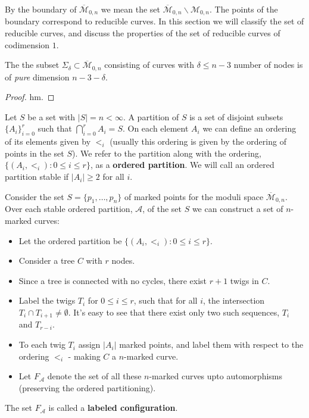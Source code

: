By the boundary of $\overline{\mathcal{M}}_{0,n}$ we mean the set $\overline{\mathcal{M}}_{0,n} \backslash \mathcal{M}_{0,n}$.
The points of the boundary correspond to reducible curves.
In this section we will classify the set of reducible curves, and discuss the properties of the set of reducible curves of codimension $1$.

\begin{proposition}
    The the subset $\Sigma_{\delta} \subset \overline{\mathcal{M}}_{0,n}$ consisting of curves with $\delta \leq n-3$ number of nodes is of \textit{pure} dimension $n-3-\delta$.
\end{proposition}
\begin{proof}
    hm.
\end{proof}

\begin{definition}
    Let $S$ be a set with $|S| = n < \infty$.
    A partition of $S$ is a set of disjoint subsets $\{A_{i}\}_{i=0}^{r}$ such that $\bigcap_{i=0}^{r}A_{i} = S$.
    On each element $A_{i}$ we can define an ordering of its elements given by $<_{i}$ (usually this ordering is given by the ordering of points in the set $S$).
    We refer to the partition along with the ordering, $\{(A_{i},<_{i}): 0 \leq i\leq r\}$, as a \textbf{ordered partition}.
    We will call an ordered partition stable if $|A_{i}|\geq 2$ for all $i$.
\end{definition}

\begin{definition}
    Consider the set $S = \{p_{1}, \dots, p_{n}\}$ of marked points for the moduli space $\overline{\mathcal{M}}_{0,n}$. 
    Over each stable ordered partition, $\mathcal{A}$, of the set $S$ we can construct a set of $n$-marked curves:
    \begin{itemize}
        \item Let the ordered partition be $\{(A_{i},<_{i}): 0 \leq i\leq r\}$.
        \item Consider a tree $C$ with $r$ nodes.
        \item Since a tree is connected with no cycles, there exist $r+1$ twigs in $C$.
        \item Label the twigs $T_{i}$ for $0\leq i \leq r$, such that for all $i$, the intersection $T_{i}\cap T_{i+1} \neq \emptyset$. 
            It's easy to see that there exist only two such sequences, $T_{i}$ and $T_{r-i}$.
        \item To each twig $T_{i}$ assign $|A_{i}|$ marked points, and label them with respect to the ordering $<_{i}$ - making $C$ a $n$-marked curve.
        \item Let $F_{\mathcal{A}}$ denote the set of all these $n$-marked curves upto automorphisms (preserving the ordered partitioning).
    \end{itemize}
    The set $F_{\mathcal{A}}$ is called a \textbf{labeled configuration}.
\end{definition}

